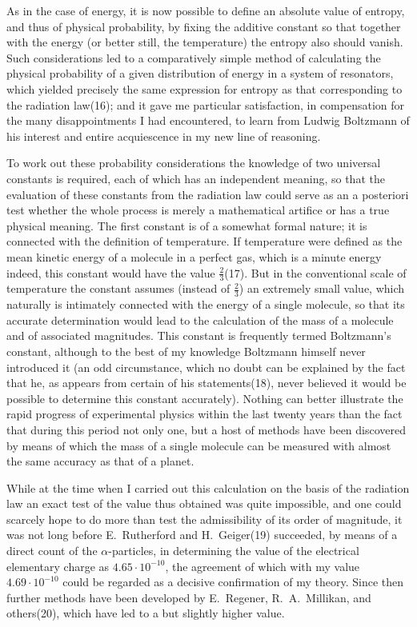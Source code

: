 \documentclass[12pt,oneside]{book}
\begin{document}
As in the case of energy, it is now possible to define
an absolute value of entropy, and thus of physical probability,
by fixing the additive constant so that together
with the energy (or better still, the temperature) the entropy
also should vanish. Such considerations led to a comparatively
simple method of calculating the physical probability
of a given distribution of energy in a system of resonators,
which yielded precisely the same expression for entropy as
that corresponding to the radiation law(16); and it gave me
particular satisfaction, in compensation for the many
disappointments I had encountered, to learn from Ludwig
Boltzmann of his interest and entire acquiescence in my
new line of reasoning.

To work out these probability considerations the knowledge
of two universal constants is required, each of which
has an independent meaning, so that the evaluation of
these constants from the radiation law could serve as an
a posteriori test whether the whole process is merely
a mathematical artifice or has a true physical meaning.
The first constant is of a somewhat formal nature; it is
connected with the definition of temperature. If temperature
were defined as the mean kinetic energy of a molecule
in a perfect gas, which is a minute energy indeed, this
constant would have the value $\frac{2}{3}$(17). But in the conventional
scale of temperature the constant assumes
(instead of $\frac{2}{3}$) an extremely small value, which naturally is
intimately connected with the energy of a single molecule,
so that its accurate determination would lead to the
calculation of the mass of a molecule and of associated
magnitudes. This constant is frequently termed Boltzmann's
constant, although to the best of my knowledge
Boltzmann himself never introduced it (an odd circumstance,
which no doubt can be explained by the fact that
he, as appears from certain of his statements(18), never
believed it would be possible to determine this constant
accurately). Nothing can better illustrate the rapid
progress of experimental physics within the last twenty
years than the fact that during this period not only one,
but a host of methods have been discovered by means of
which the mass of a single molecule can be measured with
almost the same accuracy as that of a planet.

While at the time when I carried out this calculation on
the basis of the radiation law an exact test of the value thus
obtained was quite impossible, and one could scarcely hope
to do more than test the admissibility of its order of
magnitude, it was not long before E.~Rutherford and
H.~Geiger(19) succeeded, by means of a direct count of the
$\alpha$-particles, in determining the value of the electrical elementary
charge as $4.65 \cdot 10^{-10}$, the agreement of which with
my value $4.69 \cdot 10^{-10}$ could be regarded as a decisive confirmation
of my theory. Since then further methods have
been developed by E.~Regener, R.~A.~Millikan, and others(20),
which have led to a but slightly higher value.
\end{document}
